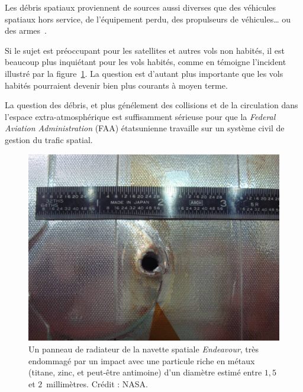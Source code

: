 	Les débris spatiaux proviennent de sources aussi diverses que des véhicules spatiaux hors service, de l'équipement perdu, des propulseurs de véhicules\ldots{} ou des armes\footnotemark~\cite{chun1999shooting}.
	
	
	Si le sujet est préoccupant pour les satellites et autres vols non habités, il est beaucoup plus inquiétant pour les vols habités, comme en témoigne l'incident illustré par la figure~\ref{fig:endeavour}. La question est d'autant plus importante que les vols habités pourraient devenir bien plus courants à moyen terme\footnotemark.
	
	
	La question des débris, et plus génélement des collisions et de la circulation dans l'espace extra-atmosphérique est suffisamment sérieuse pour que la \emph{Federal Aviation Administration} (FAA) étatsunienne travaille sur un système civil de gestion du trafic spatial\footnotemark.
	
	
	\begin{figure}[H]
		\centering
		\includegraphics[width=\textwidth]{figures/ch1/endeavour}
		\caption[Dégâts sur un panneau de radiateur de la navette spatiale \emph{Endeavour}.]{Un panneau de radiateur de la navette spatiale \emph{Endeavour}, très endommagé par un impact avec une particule riche en métaux (titane, zinc, et peut-être antimoine) d'un diamètre estimé entre $1,5$ et $2$~millimètres. Crédit : NASA\protect\footnotemark.}
		\label{fig:endeavour}
	\end{figure}
	
